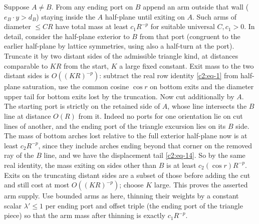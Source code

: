 Suppose \(A\ne B\). From any ending port on \(B\) append an arm outside that wall (\(e_B\cdot y>d_B\)) staying inside the \(A\) half-plane until exiting on \(A\). Such arms of diameter \(\le C R\) have total mass at least \(c_1 R^{-p}\) for suitable universal \(C,c_1>0\). In detail, consider the half-plane exterior to \(B\) from that port (congruent to the earlier half-plane by lattice symmetries, using also a half-turn at the port). Truncate it by two distant sides of the admissible triangle kind, at distances comparable to \(K R\) from the start, \(K\) a large fixed constant. Exit mass to the two distant sides is \(O((KR)^{-p})\): subtract the real row identity \eqref{c2:eq-1} from half-plane saturation, use the common cosine \(\cos r\) on bottom exits and the diameter upper tail for bottom exits lost by the truncation. Now cut additionally by \(A\). The starting port is strictly on the retained side of \(A\), whose line intersects the \(B\) line at distance \(O(R)\) from it. Indeed no ports for one orientation lie on cut lines of another, and the ending port of the triangle excursion lies on its \(B\) side. The mass of bottom arches lost relative to the full exterior half-plane now is at least \(c_2R^{-p}\), since they include arches ending beyond that corner on the removed ray of the \(B\) line, and we have the displacement tail \eqref{c2:eq-14}. So by the same real identity, the mass exiting on sides other than \(B\) is at least \(c_2(\cos r)R^{-p}\). Exits on the truncating distant sides are a subset of those before adding the cut and still cost at most \(O((KR)^{-p})\); choose \(K\) large. This proves the asserted arm supply. Use bounded arms as here, thinning their weights by a constant scalar \(\lambda'\le1\) per ending port and offset triple (the ending port of the triangle piece) so that the arm mass after thinning is exactly \(c_1R^{-p}\).

